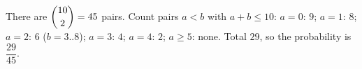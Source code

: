 There are $\dbinom{10}2=45$ pairs. Count pairs $a<b$ with $a+b\le10$: $a=0$: $9$; $a=1$: $8$; $a=2$: $6$ ($b=3..8$); $a=3$: $4$; $a=4$: $2$; $a\ge5$: none. Total $29$, so the probability is $\boxed{\dfrac{29}{45}}$.

